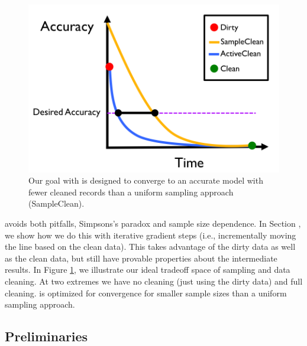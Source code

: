 \begin{figure}[t]
\centering
 \includegraphics[width=0.6\columnwidth]{figs/arch2.png}
 \caption{Our goal with \sys is designed to converge to an accurate model with fewer cleaned records than a uniform sampling approach (SampleClean). \label{sys-arch2}}
\end{figure}

\sys avoids both pitfalls, Simpsons's paradox and sample size dependence.
In Section \label{model-update}, we show how we do this with iterative gradient steps (i.e., incrementally moving the line based on the clean data).
This takes advantage of the dirty data as well as the clean data, but still have provable properties about the intermediate results.
In Figure \ref{sys-arch2}, we illustrate our ideal tradeoff space of sampling and data cleaning.
At two extremes we have no cleaning (just using the dirty data) and full cleaning.
\sys is optimized for convergence for smaller sample sizes than a uniform sampling approach.

\subsection{Preliminaries}

